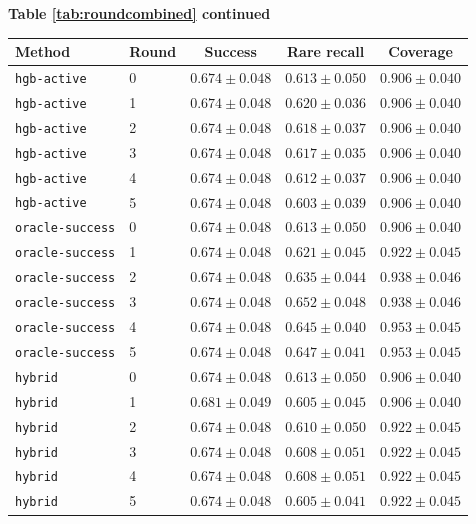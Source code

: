\documentclass{article}
\begin{document}
\begin{center}
\textbf{Table \ref{tab:roundcombined} continued}\\[0.4ex]
\begin{tabular}{llccc}
\toprule
Method & Round & Success & Rare recall & Coverage \\
\midrule
\texttt{hgb-active} & 0 & $0.674 \pm 0.048$ & $0.613 \pm 0.050$ & $0.906 \pm 0.040$ \\
\texttt{hgb-active} & 1 & $0.674 \pm 0.048$ & $0.620 \pm 0.036$ & $0.906 \pm 0.040$ \\
\texttt{hgb-active} & 2 & $0.674 \pm 0.048$ & $0.618 \pm 0.037$ & $0.906 \pm 0.040$ \\
\texttt{hgb-active} & 3 & $0.674 \pm 0.048$ & $0.617 \pm 0.035$ & $0.906 \pm 0.040$ \\
\texttt{hgb-active} & 4 & $0.674 \pm 0.048$ & $0.612 \pm 0.037$ & $0.906 \pm 0.040$ \\
\texttt{hgb-active} & 5 & $0.674 \pm 0.048$ & $0.603 \pm 0.039$ & $0.906 \pm 0.040$ \\
\texttt{oracle-success} & 0 & $0.674 \pm 0.048$ & $0.613 \pm 0.050$ & $0.906 \pm 0.040$ \\
\texttt{oracle-success} & 1 & $0.674 \pm 0.048$ & $0.621 \pm 0.045$ & $0.922 \pm 0.045$ \\
\texttt{oracle-success} & 2 & $0.674 \pm 0.048$ & $0.635 \pm 0.044$ & $0.938 \pm 0.046$ \\
\texttt{oracle-success} & 3 & $0.674 \pm 0.048$ & $0.652 \pm 0.048$ & $0.938 \pm 0.046$ \\
\texttt{oracle-success} & 4 & $0.674 \pm 0.048$ & $0.645 \pm 0.040$ & $0.953 \pm 0.045$ \\
\texttt{oracle-success} & 5 & $0.674 \pm 0.048$ & $0.647 \pm 0.041$ & $0.953 \pm 0.045$ \\
\texttt{hybrid} & 0 & $0.674 \pm 0.048$ & $0.613 \pm 0.050$ & $0.906 \pm 0.040$ \\
\texttt{hybrid} & 1 & $0.681 \pm 0.049$ & $0.605 \pm 0.045$ & $0.906 \pm 0.040$ \\
\texttt{hybrid} & 2 & $0.674 \pm 0.048$ & $0.610 \pm 0.050$ & $0.922 \pm 0.045$ \\
\texttt{hybrid} & 3 & $0.674 \pm 0.048$ & $0.608 \pm 0.051$ & $0.922 \pm 0.045$ \\
\texttt{hybrid} & 4 & $0.674 \pm 0.048$ & $0.608 \pm 0.051$ & $0.922 \pm 0.045$ \\
\texttt{hybrid} & 5 & $0.674 \pm 0.048$ & $0.605 \pm 0.041$ & $0.922 \pm 0.045$ \\

\end{tabular}
\end{center}
\end{document}
